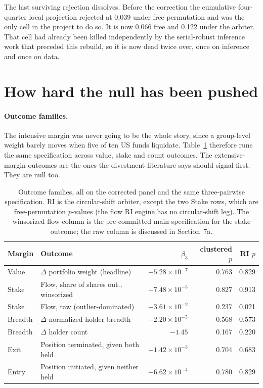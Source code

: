 \documentclass[11pt]{article}
\begin{document}
The last surviving rejection dissolves. Before the correction the cumulative
four-quarter local projection rejected at 0.039 under free permutation and was
the only cell in the project to do so. It is now 0.066 free and 0.122 under the
arbiter. That cell had already been killed independently by the serial-robust
inference work that preceded this rebuild, so it is now dead twice over, once
on inference and once on data.

\section{How hard the null has been pushed}

\paragraph{Outcome families.} The intensive margin was never going to be the
whole story, since a group-level weight barely moves when five of ten US funds
liquidate. Table~\ref{tab:families} therefore runs the same specification
across value, stake and count outcomes. The extensive-margin outcomes are the
ones the divestment literature says should signal first. They are null too.

\begin{table}[H]
\centering
\small
\caption{Outcome families, all on the corrected panel and the same
three-pairwise specification. RI is the circular-shift arbiter, except the two
Stake rows, which are free-permutation $p$-values (the flow RI engine has no
circular-shift leg). The
winsorized flow column is the pre-committed main specification for the
stake outcome; the raw column is discussed in Section~7a.}
\label{tab:families}
\begin{tabular}{llrrr}
\toprule
Margin & Outcome & $\beta_3$ & clustered $p$ & RI $p$ \\
\midrule
Value    & $\Delta$ portfolio weight (headline) & $-5.28 \times 10^{-7}$ & 0.763 & 0.829 \\
Stake    & Flow, share of shares out., winsorized & $+7.48 \times 10^{-5}$ & 0.827 & 0.913 \\
Stake    & Flow, raw (outlier-dominated)         & $-3.61 \times 10^{-2}$ & 0.237 & 0.021 \\
Breadth  & $\Delta$ normalized holder breadth    & $+2.20 \times 10^{-5}$ & 0.568 & 0.573 \\
Breadth  & $\Delta$ holder count                 & $-1.45$                & 0.167 & 0.220 \\
Exit     & Position terminated, given both held  & $+1.42 \times 10^{-3}$ & 0.704 & 0.683 \\
Entry    & Position initiated, given neither held & $-6.62 \times 10^{-4}$ & 0.780 & 0.829 \\
\bottomrule
\end{tabular}
\end{table}
\end{document}
